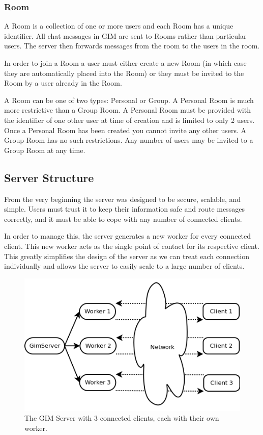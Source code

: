 \subsubsection{Room}
A Room is a collection of one or more users and each Room has a unique identifier. All chat messages in GIM are sent to Rooms rather than particular users. The server then forwards messages from the room to the users in the room.

In order to join a Room a user must either create a new Room (in which case they are automatically placed into the Room) or they must be invited to the Room by a user already in the Room. 

A Room can be one of two types: Personal or Group. A Personal Room is much more restrictive than a Group Room. A Personal Room must be provided with the identifier of one other user at time of creation and is limited to only 2 users. Once a Personal Room has been created you cannot invite any other users. A Group Room has no such restrictions. Any number of users may be invited to a Group Room at any time.

\subsection{Server Structure}

From the very beginning the server was designed to be secure, scalable, and simple. Users must trust it to keep their information safe and route messages correctly, and it must be able to cope with any number of connected clients.

In order to manage this, the server generates a new worker for every connected client. This new worker acts as the single point of contact for its respective client. This greatly simplifies the design of the server as we can treat each connection individually and allows the server to easily scale to a large number of clients.

\begin{figure}[!h]
    \begin{center}
        \includegraphics[scale=0.75]{chapter2/diagrams/server_workers.png}
        \caption{The GIM Server with 3 connected clients, each with their own worker.}
        \label{WorkersDia}
    \end{center}
\end{figure}

